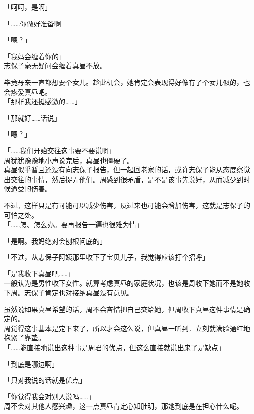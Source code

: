 「呵呵，是啊」

「……你做好准备啊」

「嗯？」

「我妈会缠着你的」\\

志保子毫无疑问会缠着真昼不放。

毕竟母亲一直都想要个女儿。趁此机会，她肯定会表现得好像有了个女儿似的，也会疼爱真昼吧。\\

「那样我还挺感激的……」

「那就好……话说」

「嗯？」

「……我们开始交往这事要不要说啊」\\

周犹犹豫豫地小声说完后，真昼也僵硬了。\\

真昼似乎暂且还没有向志保子报告，但一起回老家的话，或许志保子能从态度察觉出交往的事情，然后捉弄他们。周感到很矛盾，是不是该事先说好，从而减少到时候遭受的伤害。

不过，这样只是有可能可以减少伤害，反过来也可能会增加伤害，这就是志保子的可怕之处。\\

「……怎、怎么办。要再报告一遍也很难为情」

「是啊。我妈绝对会刨根问底的」

「不过，从志保子阿姨那里收下了宝贝儿子，我觉得应该打个招呼」

「是我收下真昼吧……」\\

一般认为是男性收下女性。就算考虑真昼的家庭状况，也该是周收下她而不是她收下周。志保子肯定也对接纳真昼没有意见。

虽然说如果真昼希望的话，周不会吝惜把自己交给她，但周收下真昼这件事情是确定的。\\

周觉得这事基本是定下来了，所以才会这么说，但真昼一听到，立刻就满脸通红地抱紧了靠垫。\\

「……能直接地说出这种事是周君的优点，但这么直接就说出来了是缺点」

「到底是哪边啊」

「只对我说的话就是优点」

「你觉得我会对别人说吗……」\\

周不会对其他人感兴趣，这一点真昼肯定心知肚明，那她到底是在担心什么呢。\\

